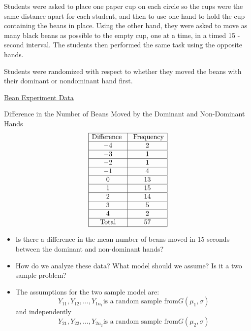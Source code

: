 \documentclass[oneside]{book}
\begin{document}
Students were asked to place one paper cup on each circle so the cups were the same distance
apart for each student, and then to use one hand to hold the cup containing the beans in place.
Using the other hand, they were asked to move as many black beans as possible to the empty
cup, one at a time, in a timed 15 -second interval. The students then performed the same
task using the opposite hands.

Students were randomized with respect to whether they moved the beans with
their dominant or nondominant hand first.

\underline{Bean Experiment Data}

Difference in the Number of Beans Moved by the Dominant and
Non-Dominant Hands
\[ \begin{array}{|c|c|}
        \hline
        \text{Difference } & \text{ Frequency} \\
        \hline
        -4                 & 2                 \\
        \hline
        -3                 & 1                 \\
        \hline
        -2                 & 1                 \\
        \hline
        -1                 & 4                 \\
        \hline
        0                  & 13                \\
        \hline
        1                  & 15                \\
        \hline
        2                  & 14                \\
        \hline
        3                  & 5                 \\
        \hline
        4                  & 2                 \\
        \hline
        \text{Total}       & 57                \\
        \hline
    \end{array} \]
\begin{itemize}
    \item Is there a difference in the mean number of beans moved in 15 seconds between the dominant and non-dominant hands?
    \item How do we analyze these data? What model should we assume? Is it a two sample problem?
    \item The assumptions for the two sample model are:
          \[Y_{11}, Y_{12}, \ldots, Y_{1 n_{1}} \text{is a random sample from} G\left(\mu_{1}, \sigma\right)\]
          and independently
          \[Y_{21}, Y_{22}, \ldots, Y_{2 n_{2}} \text{is a random sample from} G\left(\mu_{2}, \sigma\right)\]
\end{itemize}
\end{document}
